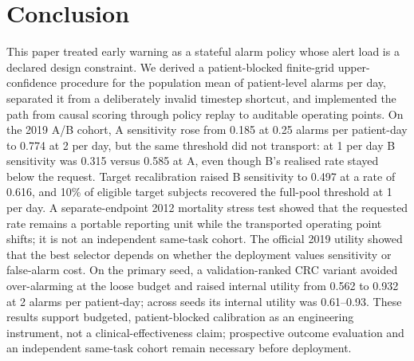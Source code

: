 \section{Conclusion}
\label{sec:conclusion}

This paper treated early warning as a stateful alarm policy whose alert load is a declared design constraint. We derived a patient-blocked finite-grid upper-confidence procedure for the population mean of patient-level alarms per day, separated it from a deliberately invalid timestep shortcut, and implemented the path from causal scoring through policy replay to auditable operating points. On the 2019 A/B cohort, A sensitivity rose from 0.185 at 0.25 alarms per patient-day to 0.774 at 2 per day, but the same threshold did not transport: at 1 per day B sensitivity was 0.315 versus 0.585 at A, even though B's realised rate stayed below the request. Target recalibration raised B sensitivity to 0.497 at a rate of 0.616, and 10\% of eligible target subjects recovered the full-pool threshold at 1 per day. A separate-endpoint 2012 mortality stress test showed that the requested rate remains a portable reporting unit while the transported operating point shifts; it is not an independent same-task cohort. The official 2019 utility showed that the best selector depends on whether the deployment values sensitivity or false-alarm cost. On the primary seed, a validation-ranked CRC variant avoided over-alarming at the loose budget and raised internal utility from 0.562 to 0.932 at 2 alarms per patient-day; across seeds its internal utility was 0.61--0.93. These results support budgeted, patient-blocked calibration as an engineering instrument, not a clinical-effectiveness claim; prospective outcome evaluation and an independent same-task cohort remain necessary before deployment.
